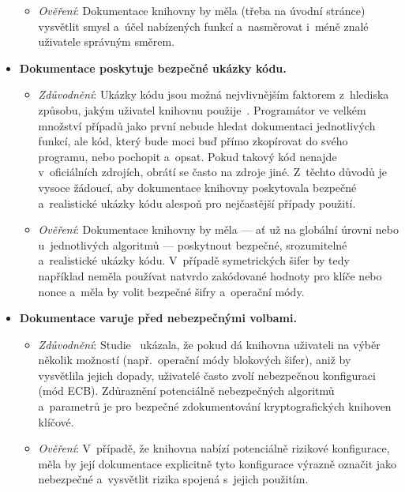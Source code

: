 \begin{itemize}
\begin{itemize}[beginpenalty=10000]
        \item \textit{Ověření}: Dokumentace knihovny by měla (třeba na úvodní stránce) vysvětlit smysl a~účel nabízených funkcí a~nasměrovat i~méně znalé uživatele správným směrem.
    \end{itemize}
    
    \item \textbf{Dokumentace poskytuje bezpečné ukázky kódu.} 
    \begin{itemize}[beginpenalty=10000]
        \item \textit{Zdůvodnění}: Ukázky kódu jsou možná nejvlivnějším faktorem z~hlediska způsobu, jakým uživatel knihovnu použije~\cite{comparing2017}. Programátor ve velkém množství případů jako první nebude hledat dokumentaci jednotlivých funkcí, ale kód, který bude moci buď přímo zkopírovat do svého programu, nebo pochopit a~opsat. Pokud takový kód nenajde v~oficiálních zdrojích, obrátí se často na zdroje jiné. Z~těchto důvodů je vysoce žádoucí, aby do\-ku\-men\-ta\-ce knihovny poskytovala bezpečné a~realistické ukázky kódu alespoň pro nejčastější případy použití.

        \item \textit{Ověření}: Dokumentace knihovny by měla --- ať už na globální úrovni nebo u~jednotlivých algoritmů --- poskytnout bezpečné, srozumitelné a~realistické ukázky kódu. V~případě symetrických šifer by tedy například neměla používat natvrdo zakódované hodnoty pro klíče nebo nonce a~měla by volit bezpečné šifry a~operační módy.
    \end{itemize}
    
    \item \textbf{Dokumentace varuje před nebezpečnými volbami.} 
    \begin{itemize}[beginpenalty=10000]
        \item \textit{Zdůvodnění}: Studie~\cite{comparing2017} ukázala, že pokud dá knihovna uživateli na výběr několik možností (např.\ operační módy blokových šifer), aniž by vysvětlila jejich dopady, uživatelé často zvolí nebezpečnou konfiguraci (mód ECB). Zdůraznění potenciálně nebezpečných algoritmů a~parametrů je pro bezpečné zdokumentování kryptografických knihoven klíčové.

        \item \textit{Ověření}: V~případě, že knihovna nabízí potenciálně rizikové konfigurace, měla by její dokumentace explicitně tyto konfigurace výrazně označit jako nebezpečné a~vysvětlit rizika spojená s~jejich použitím.
    \end{itemize}


\end{itemize}
